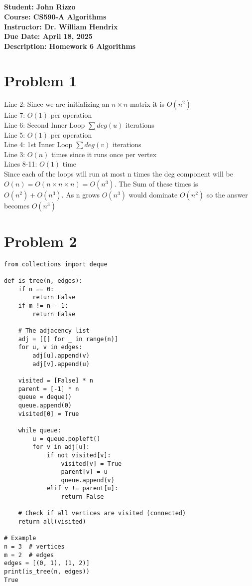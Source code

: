 \documentclass[12pt, letterpaper]{article}
\title{\classname \\ \assignmentdescription}
\author{\studentname}
\date{\duedate}
\newcommand{\studentname}          {John Rizzo           }
\newcommand{\classname}            {CS590-A Algorithms   }
\newcommand{\professorname}        {Dr. William Hendrix  }
\newcommand{\assignmentdescription}{Homework 6 Algorithms}
\newcommand{\duedate}              {April 18, 2025     }
\begin{document}
\noindent
\normalsize \textbf{Student:     \studentname} \\ [5pt]
            \textbf{Course:      \classname} \\ [5pt]
            \textbf{Instructor:  \professorname} \\ [5pt]
            \textbf{Due Date:    \duedate} \\ [5pt]
            \textbf{Description: \assignmentdescription}

\vspace{0.5cm}

\section*{Problem 1}

Line 2: Since we are initializing an $n \times n$ matrix it is $O(n^2)$\\
Line 7: $O(1)$ per operation\\
Line 6: Second Inner Loop $\sum deg(u)$ iterations\\
Line 5: $O(1)$ per operation\\
Line 4: 1st Inner Loop $\sum deg(v)$ iterations\\
Line 3: $O(n)$ times since it runs once per vertex\\
Lines 8-11: $O(1)$ time\\

Since each of the loops will run at most n times the deg component will be $O(n) = O(n \times n \times n) = O(n^3)$.  The Sum of these times is $O(n^2) + O(n^3)$.  As n grows $O(n^3)$ would dominate $O(n^2)$ so the answer becomes $O(n^3)$

\section*{Problem 2}

\begin{verbatim}
from collections import deque

def is_tree(n, edges):
    if n == 0:
        return False
    if m != n - 1:
        return False
    
    # The adjacency list
    adj = [[] for _ in range(n)]
    for u, v in edges:
        adj[u].append(v)
        adj[v].append(u)
    
    visited = [False] * n
    parent = [-1] * n
    queue = deque()
    queue.append(0)
    visited[0] = True
    
    while queue:
        u = queue.popleft()
        for v in adj[u]:
            if not visited[v]:
                visited[v] = True
                parent[v] = u
                queue.append(v)
            elif v != parent[u]:
                return False
    
    # Check if all vertices are visited (connected)
    return all(visited)

# Example 
n = 3  # vertices
m = 2  # edges
edges = [(0, 1), (1, 2)]
print(is_tree(n, edges))
True
\end{verbatim}
\end{document}
